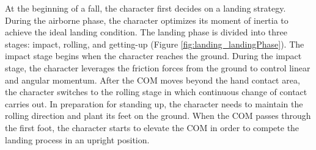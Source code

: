 At the beginning of a fall, the character first decides on a landing
strategy. During the airborne phase, the character optimizes its
moment of inertia to achieve the ideal landing condition. The landing
phase is divided into three stages: impact, rolling, and getting-up
(Figure \ref{fig:landing_landingPhase}). The impact stage begins when the
character reaches the ground. 
During the impact stage, the character leverages the friction forces 
from the ground to control linear and angular momentum. 
After the COM moves beyond the hand contact area,
the character switches to the rolling stage in which continuous change
of contact carries out. In preparation for standing up, the character
needs to maintain the rolling direction and plant its feet on the
ground. When the COM passes through the first foot, the character
starts to elevate the COM in order to compete the landing process in an
upright position.

